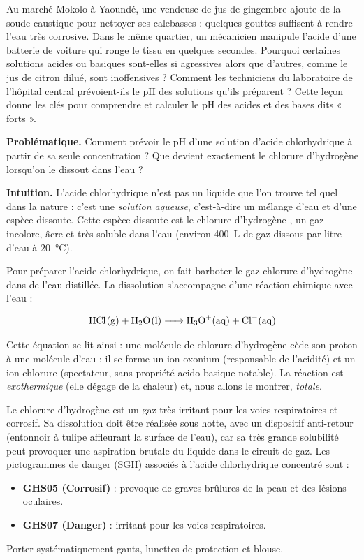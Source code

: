 \documentclass[11pt]{article}
\newcommand{\cle}[1]{{\popxbold\color{popdark}#1}}
\newcounter{popsec}
\newcounter{popsub}
\newcommand{\courssub}[1]{%
  \stepcounter{popsub}%
  \par\vspace{9pt}\noindent{\popxbold\fontsize{11.5}{13}\selectfont\color{popink}{\color{poporange}\thepopsec.\thepopsub}\hspace{6pt}#1}\par\nopagebreak\vspace{4pt}
}
\begin{document}
Au marché Mokolo à Yaoundé, une vendeuse de jus de gingembre ajoute de la soude caustique pour nettoyer ses calebasses : quelques gouttes suffisent à rendre l'eau très corrosive. Dans le même quartier, un mécanicien manipule l'acide d'une batterie de voiture qui ronge le tissu en quelques secondes. Pourquoi certaines solutions acides ou basiques sont-elles si agressives alors que d'autres, comme le jus de citron dilué, sont inoffensives ? Comment les techniciens du laboratoire de l'hôpital central prévoient-ils le pH des solutions qu'ils préparent ? Cette leçon donne les clés pour comprendre et calculer le pH des acides et des bases dits « forts ».

\textbf{Problématique.} Comment prévoir le pH d'une solution d'acide chlorhydrique à partir de sa seule concentration ? Que devient exactement le chlorure d'hydrogène lorsqu'on le dissout dans l'eau ?

\courssub{Préparation de l'acide chlorhydrique}

\textbf{Intuition.} L'acide chlorhydrique n'est pas un liquide que l'on trouve tel quel dans la nature : c'est une \emph{solution aqueuse}, c'est-à-dire un mélange d'eau et d'une espèce dissoute. Cette espèce dissoute est le \cle{chlorure d'hydrogène} , un gaz incolore, âcre et très soluble dans l'eau (environ \SI{400}{L} de gaz dissous par litre d'eau à \SI{20}{\celsius}).

Pour préparer l'acide chlorhydrique, on fait barboter le gaz chlorure d'hydrogène dans de l'eau distillée. La dissolution s'accompagne d'une réaction chimique avec l'eau :

\[ \ce{HCl(g) + H2O(l) -> H3O+(aq) + Cl-(aq)} \]

Cette équation se lit ainsi : une molécule de chlorure d'hydrogène cède son proton  à une molécule d'eau ; il se forme un ion oxonium  (responsable de l'acidité) et un ion chlorure  (spectateur, sans propriété acido-basique notable). La réaction est \emph{exothermique} (elle dégage de la chaleur) et, nous allons le montrer, \emph{totale}.

\begin{attention}
Le chlorure d'hydrogène est un gaz très irritant pour les voies respiratoires et corrosif. Sa dissolution doit être réalisée sous hotte, avec un dispositif anti-retour (entonnoir à tulipe affleurant la surface de l'eau), car sa très grande solubilité peut provoquer une aspiration brutale du liquide dans le circuit de gaz.
Les pictogrammes de danger (SGH) associés à l'acide chlorhydrique concentré sont :
\begin{itemize}
\item \textbf{GHS05 (Corrosif)} : provoque de graves brûlures de la peau et des lésions oculaires.
\item \textbf{GHS07 (Danger)} : irritant pour les voies respiratoires.
\end{itemize}
Porter systématiquement gants, lunettes de protection et blouse.
\end{attention}
\end{document}
